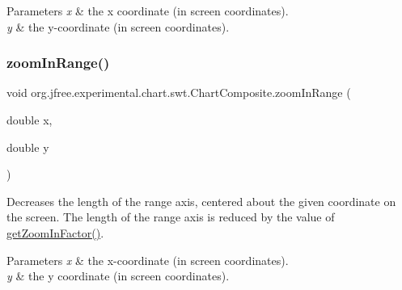 \begin{DoxyParams}{Parameters}
{\em x} & the x coordinate (in screen coordinates). \\
\hline
{\em y} & the y-\/coordinate (in screen coordinates). \\
\hline
\end{DoxyParams}
\mbox{\label{classorg_1_1jfree_1_1experimental_1_1chart_1_1swt_1_1_chart_composite_a2a28cc8870dd2036b6f63860f1bf26b7}} 
\subsubsection{\texorpdfstring{zoom\+In\+Range()}{zoomInRange()}}
{\footnotesize\ttfamily void org.\+jfree.\+experimental.\+chart.\+swt.\+Chart\+Composite.\+zoom\+In\+Range (\begin{DoxyParamCaption}\item[{double}]{x,  }\item[{double}]{y }\end{DoxyParamCaption})}

Decreases the length of the range axis, centered about the given coordinate on the screen. The length of the range axis is reduced by the value of \mbox{\hyperlink{classorg_1_1jfree_1_1experimental_1_1chart_1_1swt_1_1_chart_composite_a3cbdc5dd4939115b7ab7460273a5b43e}{get\+Zoom\+In\+Factor()}}.


\begin{DoxyParams}{Parameters}
{\em x} & the x-\/coordinate (in screen coordinates). \\
\hline
{\em y} & the y coordinate (in screen coordinates). \\
\hline
\end{DoxyParams}
\mbox{\label{classorg_1_1jfree_1_1experimental_1_1chart_1_1swt_1_1_chart_composite_a455458e3bf5718afb399990c0506f27d}} 
